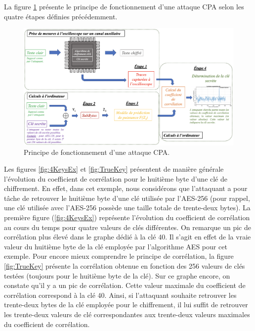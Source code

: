 \documentclass[oneside]{book}
\begin{document}
\hspace{-0.5 cm}La figure \ref{fig:CPA_attacks} présente le principe de fonctionnement d'une attaque CPA selon les quatre étapes définies précédemment. 
\begin{figure}[htbp]
    \hspace{-1.3cm}
    \includegraphics[scale=0.56]{image/CPA_attacks}
    \caption{Principe de fonctionnement d'une attaque CPA.}
    \label{fig:CPA_attacks}
\end{figure}

 \vspace{1cm}\hspace{-0.5 cm}Les figures \ref{fig:4KeysEx} et \ref{fig:TrueKey} présentent de manière générale l'évolution du coefficient de corrélation pour le huitième byte d'une clé de chiffrement. En effet, dans cet exemple, nous considérons que l'attaquant a pour tâche de retrouver le huitième byte d'une clé utilisée par l'AES-256 (pour rappel, une clé utilisée avec l'AES-256 possède une taille totale de trente-deux bytes). La première figure (\ref{fig:4KeysEx}) représente l'évolution du coefficient de corrélation au cours du temps pour quatre valeurs de clés différentes. On remarque un pic de corrélation plus élevé dans le graphe dédié à la clé 40. Il s'agit en effet de la vraie valeur du huitième byte de la clé employée par l'algorithme AES pour cet exemple. Pour encore mieux comprendre le principe de corrélation, la figure \ref{fig:TrueKey} présente la corrélation obtenue en fonction des 256 valeurs de clés testées (toujours pour le huitième byte de la clé). Sur ce graphe encore, on constate qu'il y a un pic de corrélation. Cette valeur maximale du coefficient de corrélation correspond à la clé 40. Ainsi, si l'attaquant souhaite retrouver les trente-deux bytes de la clé employée pour le chiffrement, il lui suffit de retrouver les trente-deux valeurs de clé correspondantes aux trente-deux valeurs maximales du coefficient de corrélation.
\end{document}
